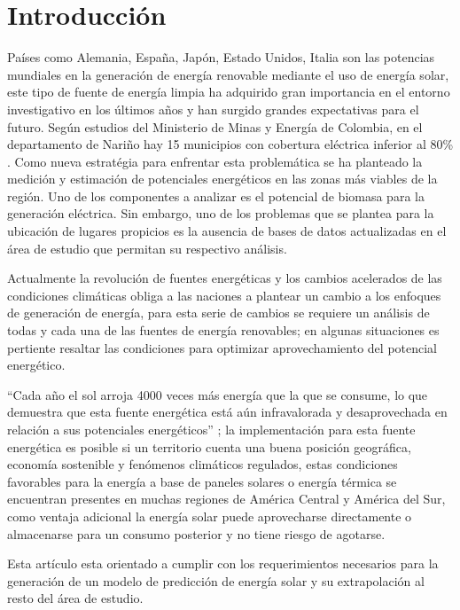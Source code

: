 \section{Introducción}

\IEEEPARstart 
Países como Alemania, España, Japón, Estado Unidos, Italia son las potencias mundiales 
en la generación de energía renovable mediante el uso de energía solar,  este tipo de 
fuente de energía limpia ha adquirido gran importancia en el entorno investigativo en los 
últimos años y han surgido grandes expectativas para el futuro. Según estudios del Ministerio de Minas y 
Energía de Colombia, en el departamento de Nariño hay 15 municipios con 
cobertura eléctrica inferior al 80\% \cite{ministerio_de_minas_y_energia_plan_2008}. Como nueva estratégia para
enfrentar esta problemática se ha planteado la medición y estimación de potenciales energéticos en las zonas más 
viables de la región. Uno de los componentes a analizar es el potencial de biomasa para la generación
eléctrica. Sin embargo, uno de los problemas que se plantea para la ubicación de lugares propicios es la 
ausencia de bases de datos actualizadas en el área de estudio que permitan su respectivo análisis.

Actualmente  la revolución de fuentes energéticas y los cambios acelerados 
 de las condiciones climáticas obliga a las naciones a plantear un cambio a los 
 enfoques de generación de energía, para esta serie de cambios se requiere un 
 análisis de todas y cada una de las fuentes de energía renovables; en algunas 
 situaciones es pertiente resaltar las condiciones para optimizar aprovechamiento del potencial energético. 

``Cada año el sol arroja 4000 veces más energía que la que se consume, lo que demuestra 
que esta fuente energética está aún infravalorada y desaprovechada  en relación a sus 
potenciales energéticos'' \cite{cervantes2014diseno}; 
la implementación para esta fuente energética es posible si un territorio cuenta una buena posición 
geográfica, economía sostenible y fenómenos climáticos regulados, estas condiciones favorables para la energía a base 
de paneles solares o energía térmica se encuentran presentes en muchas regiones de América Central y América del Sur,
 como ventaja adicional la energía solar puede aprovecharse directamente o almacenarse para un consumo posterior
 y no tiene riesgo de agotarse.
 
Esta artículo esta orientado a cumplir con los requerimientos necesarios para la generación de un modelo 
de predicción de energía solar y su extrapolación al resto del área de estudio.

